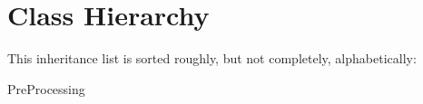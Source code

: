 \section{Class Hierarchy}
This inheritance list is sorted roughly, but not completely, alphabetically\+:\begin{DoxyCompactList}
\item {}
\item Pre\+Processing\begin{DoxyCompactList}
\item {}
\end{DoxyCompactList}
\end{DoxyCompactList}
